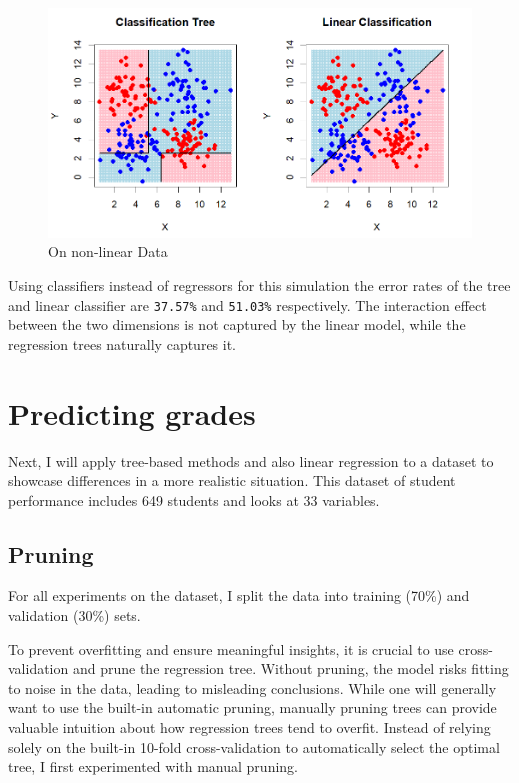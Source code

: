 \documentclass[12pt]{article}
\begin{document}
\begin{figure}
    \centering
    \includegraphics[scale=0.30]{NLD Pred.png}
    \caption{On non-linear Data}
\end{figure}

Using classifiers instead of regressors for this simulation the error rates of the tree and linear classifier are \texttt{37.57\%} and \texttt{51.03\%} respectively. The interaction effect between the two dimensions is not captured by the linear model, while the regression trees naturally captures it.


\section{Predicting grades}

Next, I will apply tree-based methods and also linear regression to a dataset to showcase differences in a more realistic situation. This dataset of student performance includes 649 students and looks at 33 variables.


\subsection{Pruning}

For all experiments on the dataset, I split the data into training (70\%) and validation (30\%) sets.

To prevent overfitting and ensure meaningful insights, it is crucial to use cross-validation and prune the regression tree. Without pruning, the model risks fitting to noise in the data, leading to misleading conclusions. While one will generally want to use the built-in automatic pruning, manually pruning trees can provide valuable intuition about how regression trees tend to overfit. Instead of relying solely on the built-in 10-fold cross-validation to automatically select the optimal tree, I first experimented with manual pruning.
\end{document}
